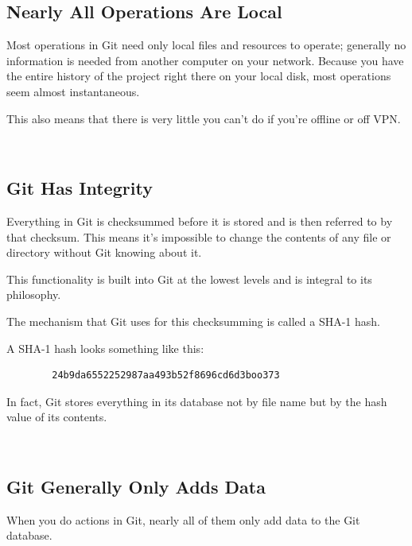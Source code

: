 \documentclass{tufte-handout}
\begin{document}
	
	\clearpage
	
	\subsection{Nearly All Operations Are Local}
	
	Most operations in Git need only local files and resources to operate; generally no information is needed from another computer on your network. Because you have the entire history of the project right there on your local disk, most operations seem almost instantaneous.
	
	This also means that there is very little you can't do if you're offline or off VPN.
	
	\vspace{3pt}
	\noindent\hrulefill
	\vspace{3pt} \\	
	
	\subsection{Git Has Integrity}
	
	Everything in Git is checksummed before it is stored and is then referred to by that checksum. This means it's impossible to change the contents of any file or directory without Git knowing about it.
	
	This functionality is built into Git at the lowest levels and is integral to its philosophy.
	
	The mechanism that Git uses for this checksumming is called a SHA-1 hash.
	
	A SHA-1 hash looks something like this:
	\begin{verbatim}
		24b9da6552252987aa493b52f8696cd6d3boo373
	\end{verbatim}

	
	In fact, Git stores everything in its database not by file name but by the hash value of its contents.
	
	\vspace{3pt}
	\noindent\hrulefill
	\vspace{3pt} \\	
	
	\subsection{Git Generally Only Adds Data}
	
	When you do actions in Git, nearly all of them only add data to the Git database.
	
\end{document}
